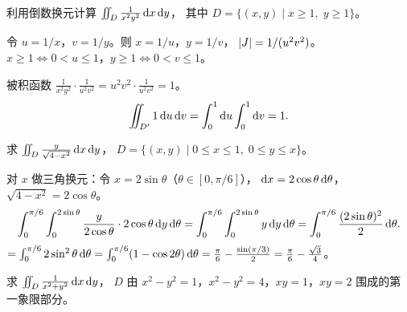 \documentclass{ctexart}
\begin{document}
\begin{exercise}
  利用倒数换元计算 $\iint_D \frac{1}{x^2 y^2}\,\mathrm{d} x\,\mathrm{d} y$，
  其中 $D = \{(x,y) \mid x \ge 1,\; y \ge 1\}$。
\end{exercise}

\begin{solution}
  令 $u = 1/x$，$v = 1/y$。则 $x = 1/u$，$y = 1/v$，
  $\left| J \right| = 1/(u^2 v^2)$。
  $x \ge 1 \Leftrightarrow 0 < u \le 1$，$y \ge 1 \Leftrightarrow 0 < v \le 1$。

  被积函数 $\frac{1}{x^2 y^2} \cdot \frac{1}{u^2 v^2} = u^2 v^2 \cdot \frac{1}{u^2 v^2} = 1$。
  \[
    \iint_{D'} 1 \,\mathrm{d} u\,\mathrm{d} v = \int_0^1 \mathrm{d} u\int_0^1 \mathrm{d} v = 1.
  \]
\end{solution}

\begin{exercise}
  求 $\iint_D \frac{y}{\sqrt{4-x^2}}\,\mathrm{d} x\,\mathrm{d} y$，
  $D = \{(x,y) \mid 0 \le x \le 1,\; 0 \le y \le x\}$。
\end{exercise}

\begin{solution}
  对 $x$ 做三角换元：令 $x = 2\sin\theta$（$\theta \in [0, \pi/6]$），
  $\mathrm{d} x = 2\cos\theta\,\mathrm{d}\theta$，$\sqrt{4-x^2} = 2\cos\theta$。
  \[
    \int_0^{\pi/6}\int_0^{2\sin\theta} \frac{y}{2\cos\theta}\cdot 2\cos\theta \,\mathrm{d} y\,\mathrm{d}\theta
    = \int_0^{\pi/6}\int_0^{2\sin\theta} y \,\mathrm{d} y\,\mathrm{d}\theta
    = \int_0^{\pi/6} \frac{(2\sin\theta)^2}{2} \,\mathrm{d}\theta.
  \]
  $= \int_0^{\pi/6} 2\sin^2\theta\,\mathrm{d}\theta
  = \int_0^{\pi/6}(1-\cos 2\theta)\,\mathrm{d}\theta
  = \frac{\pi}{6} - \frac{\sin(\pi/3)}{2}
  = \frac{\pi}{6} - \frac{\sqrt{3}}{4}$。
\end{solution}

\begin{exercise}
  求 $\iint_D \frac{1}{x^2+y^2}\,\mathrm{d} x\,\mathrm{d} y$，
  $D$ 由 $x^2 - y^2 = 1$，$x^2 - y^2 = 4$，$xy = 1$，$xy = 2$ 围成的第一象限部分。
\end{exercise}
\end{document}
